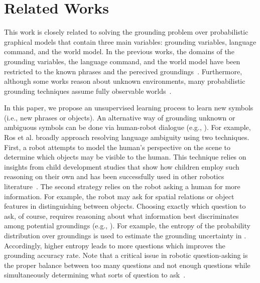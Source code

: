 \section{Related Works}
\label{sec:related}
This work is closely related to solving the grounding problem over probabilistic graphical models that contain three main variables: grounding variables, language command, and the world model.
In the previous works, the domains of the grounding variables, the language command, and the world model have been restricted to the known phrases and the perecived groundings~\cite{g3,dcg}.
Furthermore, although some works reason about unknown environments, many probabilistic grounding techniques assume fully observable worlds~\cite{citeLangNoisySensor,outside1}.

In this paper, we propose an unsupervised learning process to learn new symbols (i.e., new phrases or objects). An alternative way of grounding unknown or ambiguous symbols can be done via human-robot dialogue (e.g., \cite{whichOne}). For example, Ros et al. broadly approach resolving language ambiguity using two techniques. First, a robot attempts to model the human's perspective on the scene to determine which objects may be visible to the human.
This technique relies on insights from child development studies that show how children employ such reasoning on their own and has been successfully used in other robotics literature~\cite{kids1,kids2,perspective1,perspective2}.
The second strategy relies on the robot asking a human for more information.
For example, the robot may ask for spatial relations or object features in distinguishing between objects.
Choosing exactly which question to ask, of course, requires reasoning about what information best discriminates among potential groundings (e.g., \cite{clarifyingCommands}). %
For example, the entropy of the probability distribution over groundings is used to estimate the grounding uncertainty in \cite{clarifyingCommands}. Accordingly, higher entropy leads to more questions which improves the grounding accuracy rate.
Note that a critical issue in robotic question-asking is the proper balance between too many questions and not enough questions while simultaneously determining what sorts of question to ask~\cite{interaction1,interaction2}.

